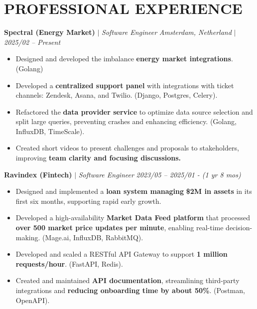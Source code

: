 \documentclass[11 pt,a4paper]{article} %
\newcommand{\companynamesize}{\large}         %
\newcommand{\jobtitlesize}{\normalsize}       %
\newcommand{\datesize}{\small}                %
\newcommand{\techstacksize}{\small}           %
\newlength{\itemgap}
\newlength{\jobgap}
\newcommand{\techstack}[1]{\textcolor{techcolor}{\techstacksize #1}}
\begin{document}
\section*{PROFESSIONAL EXPERIENCE}

{\companynamesize \textbf{\textcolor{companycolor}{Spectral (Energy Market)}}} $|$ {\jobtitlesize \textit{\textcolor{positioncolor}{Software Engineer}}} \hfill {\datesize \textit{\textcolor{companycolor}{Amsterdam, Netherland $|$ 2025/02 -- Present}}} %
\begin{itemize}[leftmargin=0.2in, itemsep=\itemgap, topsep=2pt]
    \item Designed and developed the imbalance \textbf{energy market integrations}. \techstack{(Golang)} %
    \item Developed a \textbf{centralized support panel} with integrations with ticket channels: Zendesk, Asana, and Twilio. \techstack{(Django, Postgres, Celery)}. %
    \item Refactored the \textbf{data provider service} to optimize data source selection and split large queries, preventing crashes and enhancing efficiency. \techstack{(Golang, InfluxDB, TimeScale)}. %
    \item Created short videos to present challenges and proposals to stakeholders, improving \textbf{team clarity and focusing discussions.} %
\end{itemize}

\vspace{\jobgap}

{\companynamesize \textbf{\textcolor{companycolor}{Ravindex (Fintech)}}} $|$ {\jobtitlesize \textit{\textcolor{positioncolor}{Software Engineer}}} \hfill {\datesize \textit{\textcolor{companycolor}{2023/05 -- 2025/01 - (1 yr 8 mos)}}} %
\begin{itemize}[leftmargin=0.2in, itemsep=\itemgap, topsep=2pt]
    \item Designed and implemented a \textbf{loan system managing} \textbf{\$2M in assets} in its first six months, supporting rapid early growth. %
    \item Developed a high-availability \textbf{Market Data Feed platform} that processed \textbf{over 500 market price updates per minute}, enabling real-time decision-making. \techstack{(Mage.ai, InfluxDB, RabbitMQ)}. %
    \item Developed and scaled a RESTful API Gateway to support \textbf{1 million requests/hour}. \techstack{(FastAPI, Redis)}. %
    \item Created and maintained \textbf{API documentation}, streamlining third-party integrations and \textbf{reducing onboarding time by about 50\%}. \techstack{(Postman, OpenAPI)}. %
\end{itemize}
\end{document}
